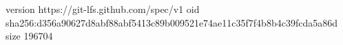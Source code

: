 version https://git-lfs.github.com/spec/v1
oid sha256:d356a90627d8abf88abf5413c89b009521e74ae11c35f7f4b8b4c39fcda5a86d
size 196704
